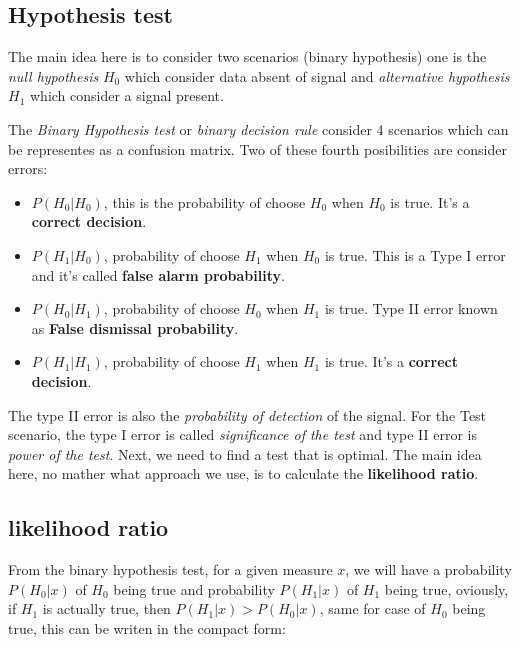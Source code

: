 \subsection{Hypothesis test}

\newp The main idea here is to consider two scenarios (binary hypothesis)  one is the \textit{null hypothesis} $H_0$ which consider data absent of signal and \textit{alternative hypothesis} $H_1$ which consider a signal present.


\newp The \textit{Binary Hypothesis test} or \textit{binary decision rule} consider 4 scenarios which can be representes as a confusion matrix. Two of these fourth posibilities are consider errors:
\begin{itemize}
\item $P(H_0|H_0)$, this is the probability of choose $H_0$ when $H_0$ is true. It's a \textbf{correct decision}.
\item $P(H_1|H_0)$, probability of choose $H_1$ when $H_0$ is true. This is a Type I error and it's called \textbf{false alarm probability}.
\item $P(H_0|H_1)$, probability of choose $H_0$ when $H_1$ is true. Type II error known as \textbf{False dismissal probability}.
\item $P(H_1|H_1)$, probability of choose $H_1$ when $H_1$ is true. It's a \textbf{correct decision}.
\end{itemize}
\newp The type II error is also the \textit{probability of detection} of the signal. For the Test scenario, the type I error is called \textit{significance of the test} and type II error is \textit{power of the test}. 
\newp Next, we need to find a test that is optimal. The main idea here, no mather what approach we use, is to calculate the \textbf{likelihood ratio}.
\subsection{likelihood ratio}
\newp From the binary hypothesis test, for a given measure $x$, we will have a probability $P(H_0|x)$ of $H_0$ being true and probability $P(H_1|x)$ of $H_1$ being true, oviously, if $H_1$ is actually true, then $P(H_1|x) > P(H_0|x)$, same for case of $H_0$ being true, this can be writen in the compact form:


